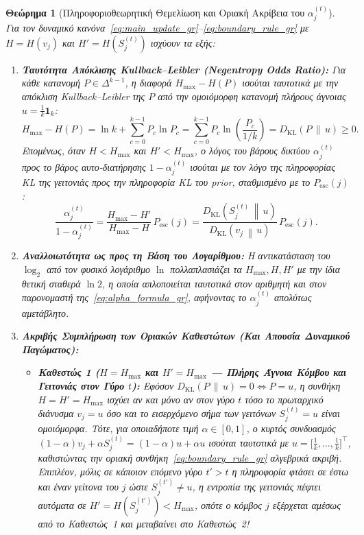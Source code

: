 \documentclass[11pt, a4paper]{article}
\newtheorem{theorem}{Θεώρημα}
\theoremstyle{definition}
\theoremstyle{definition}
\begin{document}
\begin{theorem}[Πληροφοριοθεωρητική Θεμελίωση και Οριακή Ακρίβεια του $\alpha_j^{(t)}$]\label{thm:main_gr}
Για τον δυναμικό κανόνα~\eqref{eq:main_update_gr}--\eqref{eq:boundary_rule_gr} με $H = H(v_j)$ και $H' = H(S_j^{(t)})$ ισχύουν τα εξής:
\begin{enumerate}[label=(\roman*)]
\item \textbf{Ταυτότητα Απόκλισης Kullback--Leibler (Negentropy Odds Ratio):} Για κάθε κατανομή $P \in \Delta^{k-1}$, η διαφορά $H_{\max} - H(P)$ ισούται ταυτοτικά με την απόκλιση Kullback--Leibler της $P$ από την ομοιόμορφη κατανομή πλήρους άγνοιας $u = \frac{1}{k}\mathbf{1}_k$:
\begin{equation}\label{eq:kl_identity_gr}
H_{\max} - H(P) = \ln k + \sum_{c=0}^{k-1} P_c \ln P_c = \sum_{c=0}^{k-1} P_c \ln\!\left(\frac{P_c}{1/k}\right) = D_{\mathrm{KL}}(P \,\|\, u) \ge 0.
\end{equation}
Επομένως, όταν $H < H_{\max}$ και $H' < H_{\max}$, ο λόγος του βάρους δικτύου $\alpha_j^{(t)}$ προς το βάρος αυτο-διατήρησης $1 - \alpha_j^{(t)}$ ισούται με τον λόγο της πληροφορίας KL της γειτονιάς προς την πληροφορία KL του prior, σταθμισμένο με το $P_{\mathrm{esc}}(j)$:
\begin{equation}\label{eq:odds_kl_gr}
\frac{\alpha_j^{(t)}}{1 - \alpha_j^{(t)}} = \frac{H_{\max} - H'}{H_{\max} - H}\,P_{\mathrm{esc}}(j) = \frac{D_{\mathrm{KL}}\!\left(S_j^{(t)} \,\middle\|\, u\right)}{D_{\mathrm{KL}}\!\left(v_j \,\middle\|\, u\right)}\,P_{\mathrm{esc}}(j).
\end{equation}
\item \textbf{Αναλλοιωτότητα ως προς τη Βάση του Λογαρίθμου:} Η αντικατάσταση του $\log_2$ από τον φυσικό λογάριθμο $\ln$ πολλαπλασιάζει τα $H_{\max}, H, H'$ με την ίδια θετική σταθερά $\ln 2$, η οποία απλοποιείται ταυτοτικά στον αριθμητή και στον παρονομαστή της~\eqref{eq:alpha_formula_gr}, αφήνοντας το $\alpha_j^{(t)}$ απολύτως αμετάβλητο.
\item \textbf{Ακριβής Συμπλήρωση των Οριακών Καθεστώτων (Και Απουσία Δυναμικού Παγώματος):}
\begin{itemize}
\item \textbf{Καθεστώς 1 ($H = H_{\max}$ και $H' = H_{\max}$ --- Πλήρης Άγνοια Κόμβου και Γειτονιάς στον Γύρο $t$):} Εφόσον $D_{\mathrm{KL}}(P \,\|\, u) = 0 \iff P = u$, η συνθήκη $H = H' = H_{\max}$ ισχύει αν και μόνο αν στον γύρο $t$ τόσο το πρωταρχικό διάνυσμα $v_j = u$ όσο και το εισερχόμενο σήμα των γειτόνων $S_j^{(t)} = u$ είναι ομοιόμορφα. Τότε, για οποιαδήποτε τιμή $\alpha \in [0,1]$, ο κυρτός συνδυασμός $(1-\alpha)v_j + \alpha S_j^{(t)} = (1-\alpha)u + \alpha u$ ισούται ταυτοτικά με $u = \big[\frac{1}{k}, \dots, \frac{1}{k}\big]^\top$, καθιστώντας την οριακή συνθήκη~\eqref{eq:boundary_rule_gr} αλγεβρικά ακριβή. Επιπλέον, μόλις σε κάποιον επόμενο γύρο $t' > t$ η πληροφορία φτάσει σε έστω και έναν γείτονα του $j$ ώστε $S_j^{(t')} \ne u$, η εντροπία της γειτονιάς πέφτει αυτόματα σε $H' = H(S_j^{(t')}) < H_{\max}$, οπότε ο κόμβος $j$ εξέρχεται αμέσως από το Καθεστώς~1 και μεταβαίνει στο Καθεστώς~2!

\end{itemize}
\end{enumerate}
\end{theorem}
\end{document}
